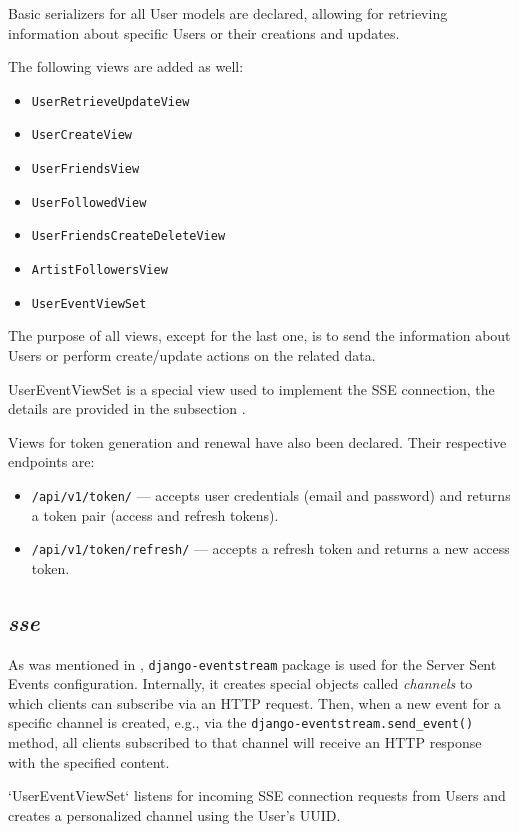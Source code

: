 Basic serializers for all User models are declared,
allowing for retrieving information about specific Users or their creations and updates.

The following views are added as well:
\begin{itemize}
    \item \texttt{UserRetrieveUpdateView}
    \item \texttt{UserCreateView}
    \item \texttt{UserFriendsView}
    \item \texttt{UserFollowedView}
    \item \texttt{UserFriendsCreateDeleteView}
    \item \texttt{ArtistFollowersView}
    \item \texttt{UserEventViewSet}
\end{itemize}

The purpose of all views, except for the last one, is to send the information
about Users or perform create/update actions on the related data.

UserEventViewSet is a special view used to implement the SSE connection,
the details are provided in the subsection .

Views for token generation and renewal have also been declared. Their respective endpoints are:

\begin{itemize}
    \item \texttt{/api/v1/token/} — accepts user credentials (email and password) and returns a
    token pair (access and refresh tokens).
    \item \texttt{/api/v1/token/refresh/} — accepts a refresh token and returns a new access token.
\end{itemize}

\subsection{\textit{sse}}\label{sec:sse}
As was mentioned in , \texttt{django-eventstream} package is used for the Server Sent Events
configuration. Internally, it creates special objects called \textit{channels} to which clients can subscribe
via an HTTP request. Then, when a new event for a specific channel is created,
e.g., via the \texttt{django-eventstream.send\_event()} method, all clients subscribed to that channel
will receive an HTTP response with the specified content.

`UserEventViewSet` listens for incoming SSE connection requests from Users and creates a personalized channel using the User's UUID.

